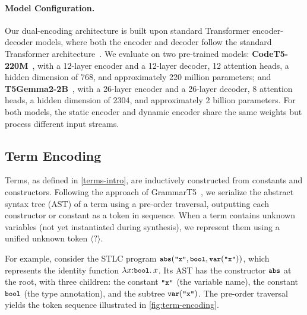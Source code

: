 \documentclass[manuscript,screen]{acmart}
\newcommand{\tcode}[1]{{\small \texttt{\spaceskip=0.2em #1}}}
\begin{document}
\paragraph{Model Configuration.}
Our dual-encoding architecture is built upon standard Transformer encoder-decoder models, where both the encoder and decoder follow the standard Transformer architecture~\cite{DBLP:conf/nips/VaswaniSPUJGKP17}. We evaluate on two pre-trained models: \textbf{CodeT5-220M}~\cite{DBLP:conf/emnlp/0034WJH21}, with  {\color{revblue}a } 12-layer encoder and  {\color{revblue}a } 12-layer decoder, 12 attention heads, a hidden dimension of 768, and approximately 220 million parameters; and \textbf{T5Gemma2-2B}~\cite{zhang2025t5gemma2seeingreading}, with  {\color{revblue}a } 26-layer encoder and  {\color{revblue}a } 26-layer decoder, 8 attention heads, a hidden dimension of 2304, and approximately 2 billion parameters. For both models, the static encoder and dynamic encoder share the same weights but process different input streams.

\subsection{Term Encoding}
\label{sec:term-encoding}
Terms, as defined in \autoref{terms-intro}, are inductively constructed from constants and constructors. Following the approach of GrammarT5~\cite{DBLP:conf/icse/ZhuL000C24}, we serialize the abstract syntax tree (AST) of a term using a pre-order traversal, outputting each constructor or constant as a token in sequence. When a term contains unknown variables (not yet instantiated during synthesis), we represent them using a unified unknown token $\langle?\rangle$.

For example, consider the STLC program $\tcode{abs}(\tcode{"x"}, \tcode{bool}, \tcode{var}(\tcode{"x"}))$, which represents the identity function $\lambda x{:}\tcode{bool}.\, x$. Its AST has the constructor $\tcode{abs}$ at the root, with three children: the constant $\tcode{"x"}$ (the variable name), the constant $\tcode{bool}$ (the type annotation), and the subtree $\tcode{var}(\tcode{"x"})$. The pre-order traversal yields the token sequence illustrated in \autoref{fig:term-encoding}.
\end{document}
